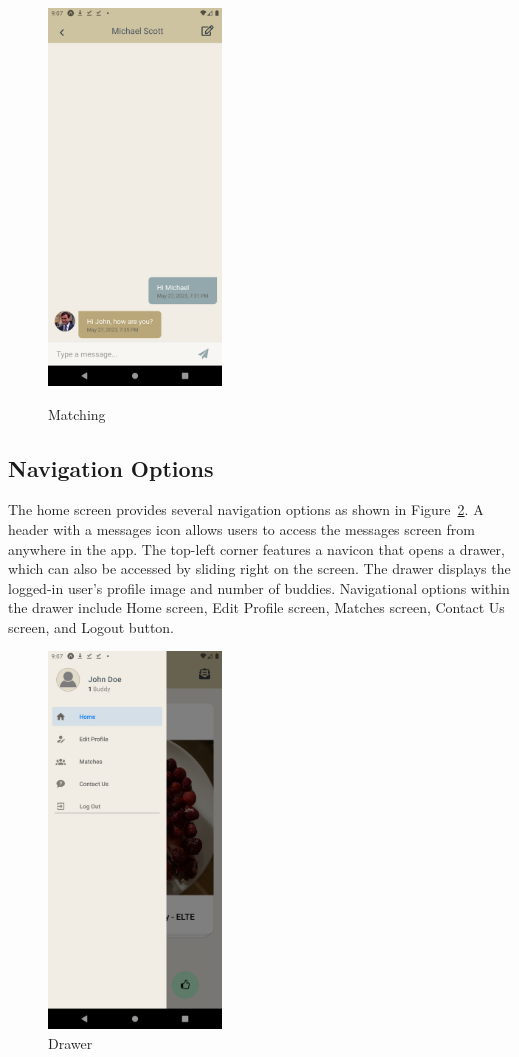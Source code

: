 \begin{figure}[H]
{		\includegraphics[width=0.45\linewidth, width=5cm, height=10cm]{images/snapshots/chat_screen_2.png}}
	\caption{Matching}
	\label{fig:matching_messaging}
\end{figure}
\subsection{Navigation Options}
The home screen provides several navigation options as shown in Figure~\ref{fig:drawer}. A header with a messages icon allows users to access the messages screen from anywhere in the app. The top-left corner features a navicon that opens a drawer, which can also be accessed by sliding right on the screen. The drawer displays the logged-in user's profile image and number of buddies. Navigational options within the drawer include Home screen, Edit Profile screen, Matches screen, Contact Us screen, and Logout button.
  \begin{figure}[H]
	\centering
	\includegraphics[width=0.45\linewidth, width=5cm, height=10cm]{images/snapshots/logout.png}
        \caption{Drawer}
	\label{fig:drawer}
  \end{figure}
